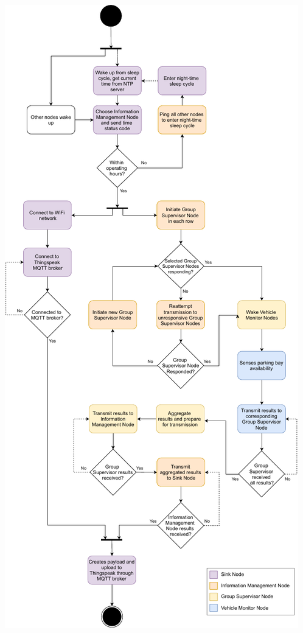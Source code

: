 \documentclass[landscape,a1paper,fontscale=0.45]{baposter} %
\begin{document}
\begin{poster}
{\begin{multicols}{2}
		\begin{center}
			\includegraphics[width=0.9\columnwidth]{flowDiagramBIG-cropped}
		\end{center}
	
	
		
	\end{multicols}
}


\end{poster}
\end{document}
